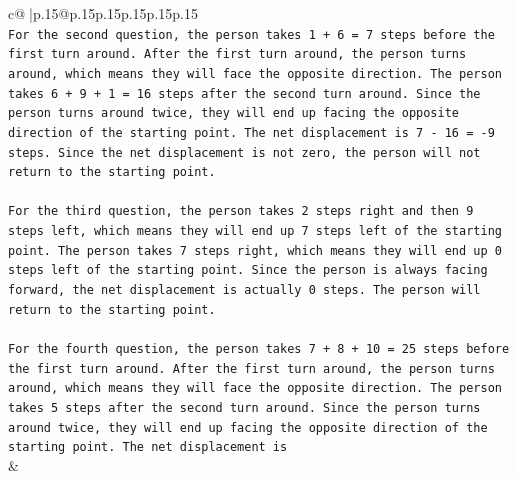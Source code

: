 \documentclass{article}
\begin{document}
{\begin{supertabular}{c@{$\;$}|p{.15\linewidth}@{}p{.15\linewidth}p{.15\linewidth}p{.15\linewidth}p{.15\linewidth}p{.15\linewidth}}
{{{\\ 
\texttt{For the second question, the person takes 1 + 6 = 7 steps before the first turn around. After the first turn around, the person turns around, which means they will face the opposite direction. The person takes 6 + 9 + 1 = 16 steps after the second turn around. Since the person turns around twice, they will end up facing the opposite direction of the starting point. The net displacement is 7 {-} 16 = {-}9 steps. Since the net displacement is not zero, the person will not return to the starting point.} \\
\\ 
\texttt{For the third question, the person takes 2 steps right and then 9 steps left, which means they will end up 7 steps left of the starting point. The person takes 7 steps right, which means they will end up 0 steps left of the starting point. Since the person is always facing forward, the net displacement is actually 0 steps. The person will return to the starting point.} \\
\\ 
\texttt{For the fourth question, the person takes 7 + 8 + 10 = 25 steps before the first turn around. After the first turn around, the person turns around, which means they will face the opposite direction. The person takes 5 steps after the second turn around. Since the person turns around twice, they will end up facing the opposite direction of the starting point. The net displacement is} \\
            }
        }
    }
    & \\ \\

\end{supertabular}
}
\end{document}
